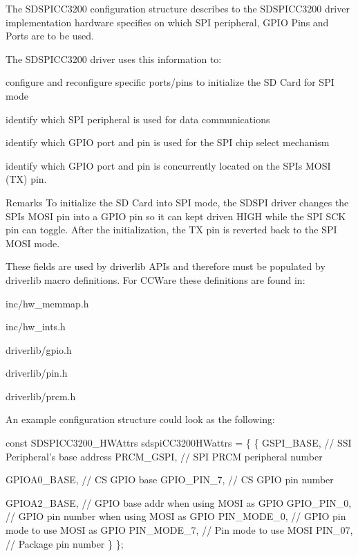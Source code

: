 The S\+D\+S\+P\+I\+C\+C3200 configuration structure describes to the S\+D\+S\+P\+I\+C\+C3200 driver implementation hardware specifies on which S\+P\+I peripheral, G\+P\+I\+O Pins and Ports are to be used.

The S\+D\+S\+P\+I\+C\+C3200 driver uses this information to\+:
\begin{DoxyItemize}
\item configure and reconfigure specific ports/pins to initialize the S\+D Card for S\+P\+I mode
\item identify which S\+P\+I peripheral is used for data communications
\item identify which G\+P\+I\+O port and pin is used for the S\+P\+I chip select mechanism
\item identify which G\+P\+I\+O port and pin is concurrently located on the S\+P\+I\textquotesingle{}s M\+O\+S\+I (T\+X) pin.
\end{DoxyItemize}

\begin{DoxyRemark}{Remarks}
To initialize the S\+D Card into S\+P\+I mode, the S\+D\+S\+P\+I driver changes the S\+P\+I\textquotesingle{}s M\+O\+S\+I pin into a G\+P\+I\+O pin so it can kept driven H\+I\+G\+H while the S\+P\+I S\+C\+K pin can toggle. After the initialization, the T\+X pin is reverted back to the S\+P\+I M\+O\+S\+I mode.
\end{DoxyRemark}
These fields are used by driverlib A\+P\+Is and therefore must be populated by driverlib macro definitions. For C\+C\+Ware these definitions are found in\+:
\begin{DoxyItemize}
\item inc/hw\+\_\+memmap.\+h
\item inc/hw\+\_\+ints.\+h
\item driverlib/gpio.\+h
\item driverlib/pin.\+h
\item driverlib/prcm.\+h
\end{DoxyItemize}

An example configuration structure could look as the following\+: 
\begin{DoxyCode}
\textcolor{keyword}{const} SDSPICC3200_HWAttrs sdspiCC3200HWattrs = \{
    \{
          GSPI\_BASE,      \textcolor{comment}{// SSI Peripheral's base address}
          PRCM\_GSPI,      \textcolor{comment}{// SPI PRCM peripheral number}

          GPIOA0\_BASE,    \textcolor{comment}{// CS GPIO base}
          GPIO\_PIN\_7,     \textcolor{comment}{// CS GPIO pin number}

          GPIOA2\_BASE,    \textcolor{comment}{// GPIO base addr when using MOSI as GPIO}
          GPIO\_PIN\_0,     \textcolor{comment}{// GPIO pin number when using MOSI as GPIO}
          PIN\_MODE\_0,     \textcolor{comment}{// GPIO pin mode to use MOSI as GPIO}
          PIN\_MODE\_7,     \textcolor{comment}{// Pin mode to use MOSI}
          PIN\_07,         \textcolor{comment}{// Package pin number}
    \}
\};
\end{DoxyCode}
 

